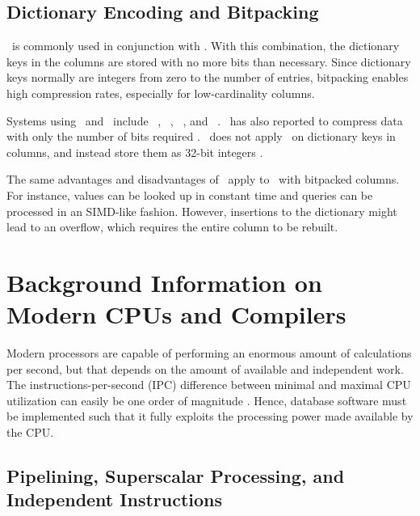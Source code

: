 \subsection{Dictionary Encoding and Bitpacking}
\label{sub:Dictionary Encoding and Bitpacking}
\de~is commonly used in conjunction with \bp. With this combination, the dictionary keys in the columns are stored with no more bits than necessary. Since dictionary keys normally are integers from zero to the number of entries, bitpacking enables high compression rates, especially for low-cardinality columns.

Systems using \de~and \bp~include \ibm~\cite{Raman2013-em}, \blink~\cite{Barber2012-xt}, \sapnw~\cite{Willhalm2009-hu}, and \saph~\cite{Psaroudakis2014-ma}. \qlikview~has also reported to compress data with only the number of bits required \cite{Qlik2014-vd}. \mssql~does not apply \bp~on dictionary keys in columns, and instead store them as 32-bit integers \cite{Larson2013-mc}.

The same advantages and disadvantages of \bp~apply to \de~with bitpacked columns. For instance, values can be looked up in constant time and queries can be processed in an SIMD-like fashion. However, insertions to the dictionary might lead to an overflow, which requires the entire column to be rebuilt.

\section{Background Information on Modern CPUs and Compilers}
\label{sec:Background Information on Modern CPUs and Compilers}
Modern processors are capable of performing an enormous amount of calculations per second, but that depends on the amount of available and independent work. The instructions-per-second (IPC) difference between minimal and maximal CPU utilization can easily be one order of magnitude \cite{Boncz2005-wj}. Hence, database software must be implemented such that it fully exploits the processing power made available by the CPU.

\subsection{Pipelining, Superscalar Processing, and Independent Instructions}
\label{sub:Pipelining, Superscalar Processing, and Independent Instructions}

